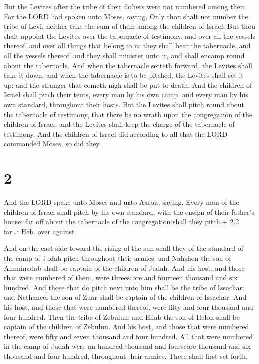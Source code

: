  But the Levites after the tribe of their fathers were
not numbered among them.  For the LORD had spoken unto
Moses, saying,  Only thou shalt not number the tribe of
Levi, neither take the sum of them among the children of Israel:
 But thou shalt appoint the Levites over the tabernacle of
testimony, and over all the vessels thereof, and over all things that
belong to it: they shall bear the tabernacle, and all the vessels
thereof; and they shall minister unto it, and shall encamp round about
the tabernacle.  And when the tabernacle setteth forward,
the Levites shall take it down: and when the tabernacle is to be
pitched, the Levites shall set it up: and the stranger that cometh nigh
shall be put to death.  And the children of Israel shall
pitch their tents, every man by his own camp, and every man by his own
standard, throughout their hosts.  But the Levites shall
pitch round about the tabernacle of testimony, that there be no wrath
upon the congregation of the children of Israel: and the Levites shall
keep the charge of the tabernacle of testimony.  And the
children of Israel did according to all that the LORD commanded Moses,
so did they.

\hypertarget{section-1}{%
\section{2}\label{section-1}}

 And the LORD spake unto Moses and unto Aaron, saying,
 Every man of the children of Israel shall pitch by his own
standard, with the ensign of their father's house: far off about the
tabernacle of the congregation shall they pitch.+ 2.2 far\ldots: Heb.
over against

 And on the east side toward the rising of the sun shall
they of the standard of the camp of Judah pitch throughout their armies:
and Nahshon the son of Amminadab shall be captain of the children of
Judah.  And his host, and those that were numbered of them,
were threescore and fourteen thousand and six hundred.  And
those that do pitch next unto him shall be the tribe of Issachar: and
Nethaneel the son of Zuar shall be captain of the children of Issachar.
 And his host, and those that were numbered thereof, were
fifty and four thousand and four hundred.  Then the tribe of
Zebulun: and Eliab the son of Helon shall be captain of the children of
Zebulun.  And his host, and those that were numbered
thereof, were fifty and seven thousand and four hundred. 
All that were numbered in the camp of Judah were an hundred thousand and
fourscore thousand and six thousand and four hundred, throughout their
armies. These shall first set forth.

